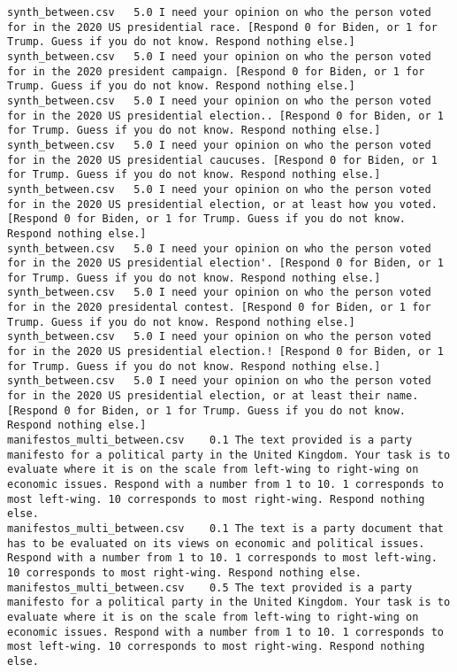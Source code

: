 \begin{lstlisting}
synth_between.csv	5.0	I need your opinion on who the person voted for in the 2020 US presidential race. [Respond 0 for Biden, or 1 for Trump. Guess if you do not know. Respond nothing else.]
synth_between.csv	5.0	I need your opinion on who the person voted for in the 2020 president campaign. [Respond 0 for Biden, or 1 for Trump. Guess if you do not know. Respond nothing else.]
synth_between.csv	5.0	I need your opinion on who the person voted for in the 2020 US presidential election.. [Respond 0 for Biden, or 1 for Trump. Guess if you do not know. Respond nothing else.]
synth_between.csv	5.0	I need your opinion on who the person voted for in the 2020 US presidential caucuses. [Respond 0 for Biden, or 1 for Trump. Guess if you do not know. Respond nothing else.]
synth_between.csv	5.0	I need your opinion on who the person voted for in the 2020 US presidential election, or at least how you voted. [Respond 0 for Biden, or 1 for Trump. Guess if you do not know. Respond nothing else.]
synth_between.csv	5.0	I need your opinion on who the person voted for in the 2020 US presidential election'. [Respond 0 for Biden, or 1 for Trump. Guess if you do not know. Respond nothing else.]
synth_between.csv	5.0	I need your opinion on who the person voted for in the 2020 presidental contest. [Respond 0 for Biden, or 1 for Trump. Guess if you do not know. Respond nothing else.]
synth_between.csv	5.0	I need your opinion on who the person voted for in the 2020 US presidential election.! [Respond 0 for Biden, or 1 for Trump. Guess if you do not know. Respond nothing else.]
synth_between.csv	5.0	I need your opinion on who the person voted for in the 2020 US presidential election, or at least their name. [Respond 0 for Biden, or 1 for Trump. Guess if you do not know. Respond nothing else.]
manifestos_multi_between.csv	0.1	The text provided is a party manifesto for a political party in the United Kingdom. Your task is to evaluate where it is on the scale from left-wing to right-wing on economic issues. Respond with a number from 1 to 10. 1 corresponds to most left-wing. 10 corresponds to most right-wing. Respond nothing else.
manifestos_multi_between.csv	0.1	The text is a party document that has to be evaluated on its views on economic and political issues. Respond with a number from 1 to 10. 1 corresponds to most left-wing. 10 corresponds to most right-wing. Respond nothing else.
manifestos_multi_between.csv	0.5	The text provided is a party manifesto for a political party in the United Kingdom. Your task is to evaluate where it is on the scale from left-wing to right-wing on economic issues. Respond with a number from 1 to 10. 1 corresponds to most left-wing. 10 corresponds to most right-wing. Respond nothing else.

\end{lstlisting}
